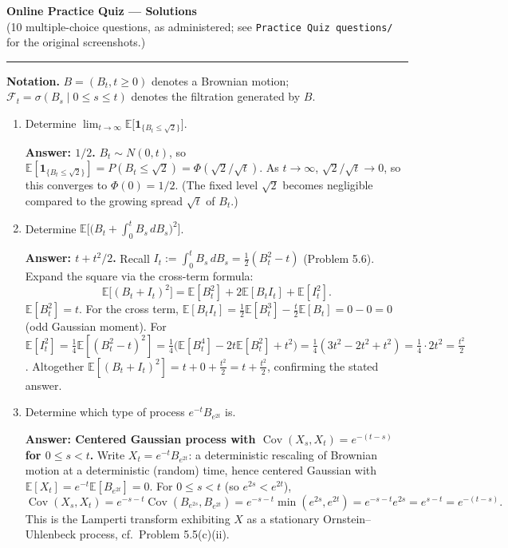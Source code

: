 \documentclass[11pt]{article}
\newcommand{\E}{\mathbb{E}}
\DeclareMathOperator{\Cov}{Cov}
\newcommand{\ans}[1]{\par\noindent\textbf{\color{blue!50!black}Answer: #1}}
\begin{document}
\begin{center}
{\LARGE\bfseries Online Practice Quiz --- Solutions}\\[4pt]
{\small (10 multiple-choice questions, as administered; see \texttt{Practice Quiz questions/} for the original screenshots.)}
\end{center}
\vspace{6pt}
\hrule
\vspace{10pt}

\noindent\textbf{Notation.} $B=(B_t,t\ge0)$ denotes a Brownian motion; $\mathcal F_t=\sigma(B_s\mid0\le s\le t)$ denotes the filtration generated by $B$.

\vspace{10pt}

\begin{enumerate}

\item[\textbf{Q1.}] Determine $\displaystyle\lim_{t\to\infty}\E\big[\mathbf1_{\{B_t\le\sqrt2\}}\big]$.

\ans{$1/2$.} $B_t\sim N(0,t)$, so $\E[\mathbf1_{\{B_t\le\sqrt2\}}]=P(B_t\le\sqrt2)=\Phi(\sqrt2/\sqrt t)$. As $t\to\infty$, $\sqrt2/\sqrt t\to0$, so this converges to $\Phi(0)=1/2$. (The fixed level $\sqrt2$ becomes negligible compared to the growing spread $\sqrt t$ of $B_t$.)

\item[\textbf{Q2.}] Determine $\E\Big[\big(B_t+\int_0^tB_s\,dB_s\big)^2\Big]$.

\ans{$t+t^2/2$.} Recall $I_t:=\int_0^tB_s\,dB_s=\tfrac12(B_t^2-t)$ (Problem 5.6). Expand the square via the cross-term formula:
\[
\E\big[(B_t+I_t)^2\big]=\E[B_t^2]+2\E[B_tI_t]+\E[I_t^2].
\]
$\E[B_t^2]=t$. For the cross term, $\E[B_tI_t]=\tfrac12\E[B_t^3]-\tfrac t2\E[B_t]=0-0=0$ (odd Gaussian moment). For $\E[I_t^2]=\tfrac14\E[(B_t^2-t)^2]=\tfrac14\big(\E[B_t^4]-2t\E[B_t^2]+t^2\big)=\tfrac14(3t^2-2t^2+t^2)=\tfrac14\cdot2t^2=\tfrac{t^2}2$. Altogether $\E[(B_t+I_t)^2]=t+0+\tfrac{t^2}2=t+\tfrac{t^2}2$, confirming the stated answer.

\item[\textbf{Q3.}] Determine which type of process $e^{-t}B_{e^{2t}}$ is.

\ans{Centered Gaussian process with $\Cov(X_s,X_t)=e^{-(t-s)}$ for $0\le s<t$.} Write $X_t=e^{-t}B_{e^{2t}}$: a deterministic rescaling of Brownian motion at a deterministic (random) time, hence centered Gaussian with $\E[X_t]=e^{-t}\E[B_{e^{2t}}]=0$. For $0\le s<t$ (so $e^{2s}<e^{2t}$),
\[
\Cov(X_s,X_t)=e^{-s-t}\Cov(B_{e^{2s}},B_{e^{2t}})=e^{-s-t}\min(e^{2s},e^{2t})=e^{-s-t}e^{2s}=e^{s-t}=e^{-(t-s)}.
\]
This is the Lamperti transform exhibiting $X$ as a stationary Ornstein--Uhlenbeck process, cf.\ Problem 5.5(c)(ii).


\end{enumerate}
\end{document}
